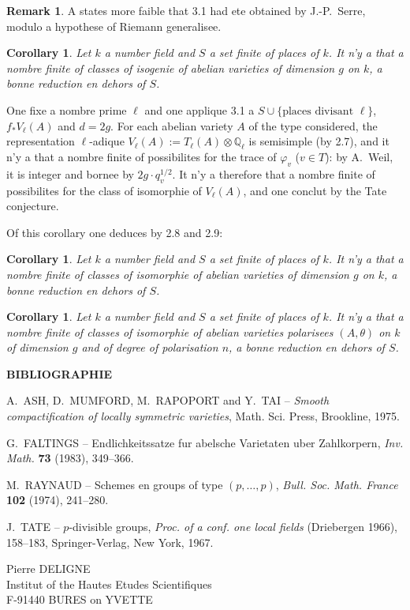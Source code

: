 \documentclass[12pt,a4paper]{article}
\theoremstyle{plain}
\newtheorem{corollary}[theorem]{Corollary}
\theoremstyle{definition}
\newtheorem{remark}[theorem]{Remark}
\theoremstyle{remark}
\newcommand{\QQ}{\mathbb{Q}}
\providecommand{\QQ}{\mathbb{Q}}
\begin{document}
\begin{remark}
A states more faible that 3.1 had ete obtained by J.-P.~Serre, modulo a hypothese of Riemann generalisee.
\end{remark}

\begin{corollary}
Let $k$ a number field and $S$ a set finite of places of $k$. It n'y a that a nombre finite of classes of isogenie of abelian varieties of dimension $g$ on $k$, a bonne reduction en dehors of $S$.
\end{corollary}

One fixe a nombre prime $\ell$ and one applique 3.1 a $S \cup \{\text{places divisant } \ell\}$, $f_* V_\ell(A)$ and $d = 2g$. For each abelian variety $A$ of the type considered, the representation $\ell$-adique $V_\ell(A) := T_\ell(A) \otimes \QQ_\ell$ is semisimple (by 2.7), and it n'y a that a nombre finite of possibilites for the trace of $\varphi_v$ ($v \in T$): by A.~Weil, it is integer and bornee by $2g \cdot q_v^{1/2}$. It n'y a therefore that a nombre finite of possibilites for the class of isomorphie of $V_\ell(A)$, and one conclut by the Tate conjecture.

Of this corollary one deduces by 2.8 and 2.9:

\begin{corollary}
Let $k$ a number field and $S$ a set finite of places of $k$. It n'y a that a nombre finite of classes of isomorphie of abelian varieties of dimension $g$ on $k$, a bonne reduction en dehors of $S$.
\end{corollary}

\begin{corollary}
Let $k$ a number field and $S$ a set finite of places of $k$. It n'y a that a nombre finite of classes of isomorphie of abelian varieties polarisees $(A,\theta)$ on $k$ of dimension $g$ and of degree of polarisation $n$, a bonne reduction en dehors of $S$.
\end{corollary}

\vspace{12pt}
\noindent\textbf{BIBLIOGRAPHIE}
\begin{enumerate}[label={[\arabic*]},leftmargin=2em,itemsep=0pt]
\item A.~ASH, D.~MUMFORD, M.~RAPOPORT and Y.~TAI -- \textit{Smooth compactification of locally symmetric varieties}, Math. Sci. Press, Brookline, 1975.
\item G.~FALTINGS -- Endlichkeitssatze fur abelsche Varietaten uber Zahlkorpern, \textit{Inv. Math.} \textbf{73} (1983), 349--366.
\item M.~RAYNAUD -- Schemes en groups of type $(p,\ldots,p)$, \textit{Bull. Soc. Math. France} \textbf{102} (1974), 241--280.
\item J.~TATE -- $p$-divisible groups, \textit{Proc. of a conf. one local fields} (Driebergen 1966), 158--183, Springer-Verlag, New York, 1967.
\end{enumerate}

\vspace{24pt}
\noindent Pierre DELIGNE\\
Institut of the Hautes Etudes Scientifiques\\
F-91440 BURES on YVETTE
\end{document}
